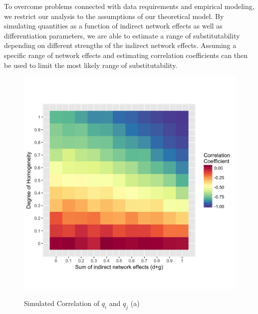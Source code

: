 \documentclass[12pt,a4paper,notitlepage]{article}
\begin{document}
To overcome problems connected with data requirements and empirical modeling, we restrict our analysis to the assumptions of our theoretical model. By simulating quantities as a function of indirect network effects as well as differentiation parameters, we are able to estimate a range of substitutability depending on different strengths of the indirect network effects. Assuming a specific range of network effects and estimating correlation coefficients can then be used to limit the most likely range of substitutability.  



\begin{figure}[H]
	\centering
	\caption{Simulated Correlation of $q_i$ and $q_j$ (a)}
	\begin{adjustbox}{width=\textwidth}	
	\includegraphics{figs/qqmatrix}
	\label{fig_QQ}
\end{adjustbox}
\end{figure}
\end{document}
